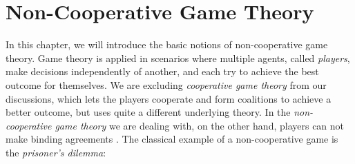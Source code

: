 \documentclass[a4paper]{scrreprt}
\begin{document}
    
    \chapter{Non-Cooperative Game Theory}
    \label{chap:nonCooperativeRealValuedGameTheory}
    In this chapter, we will introduce the basic notions of non-cooperative game theory.
    Game theory is applied in scenarios where multiple agents, called \emph{players}, make decisions independently of another, and each try to achieve the best outcome for themselves.
    We are excluding \emph{cooperative game theory} from our discussions, which lets the players cooperate and form coalitions to achieve a better outcome, but uses quite a different underlying theory.
    In the \emph{non-cooperative game theory} we are dealing with, on the other hand,
    players can not make binding agreements \cite{bib:harsanyiTheoryOfEquilibriumSelection}.
    The classical example of a non-cooperative game is the \emph{prisoner's dilemma}:
\end{document}
